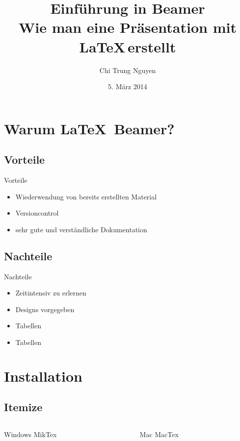 \documentclass[xcolor=x11names,compress]{beamer} %
\title[Latex Beamer Einführung]{Einführung in Beamer\\Wie man eine Präsentation mit \LaTeX \,erstellt}
\author{Chi Trung Nguyen}
\institute{HfTL}
\date{5. März 2014}
\renewcommand{\(}{\begin{columns}}
\renewcommand{\)}{\end{columns}}
\newcommand{\<}[1]{\begin{column}{#1}}
\renewcommand{\>}{\end{column}}
\begin{document}
	\begin{frame}
		\titlepage
	\end{frame}

\section{Warum \LaTeX\, Beamer?}
	\subsection{Vorteile}
		\begin{frame}{Vorteile}
			\begin{itemize}
				\item Wiederwendung von bereits erstellten Material
				\pause
				\item Versioncontrol
				\pause
				\item sehr gute und verständliche Dokumentation
			\end{itemize}

		\end{frame}

	\subsection{Nachteile}
		\begin{frame}{Nachteile}
			\begin{itemize}
				\item Zeitintensiv zu erlernen
				\pause
				\item Designs vorgegeben
				\pause
				\item Tabellen
				\pause
				\item Tabellen
			\end{itemize}
		\end{frame}

\section{Installation}
	\subsection{Itemize}
		\begin{frame}
			\begin{columns}
				\begin{column}[l]{5cm}
					\begin{block}{Windows}
						MikTex
					\end{block}
				\end{column}
				\pause
				\begin{column}[r]{5cm}
					\begin{block}{Mac}
						MacTex
					\end{block}
				\end{column}
			\end{columns}
		\end{frame}
\end{document}
